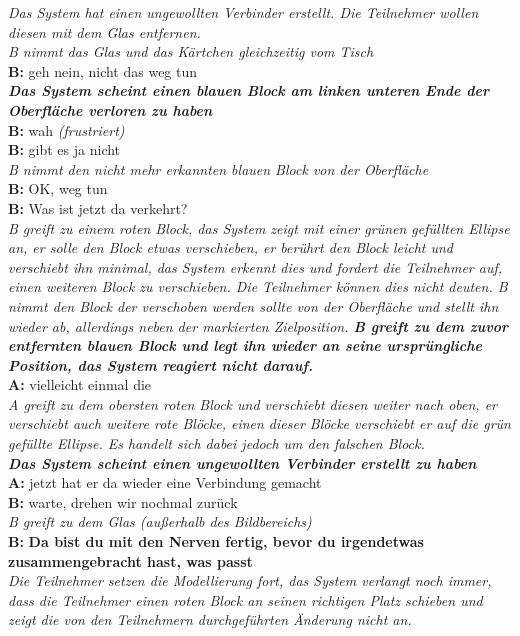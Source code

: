 \begin{transkript}
\emph{Das System hat einen ungewollten Verbinder erstellt. Die Teilnehmer wollen diesen mit dem Glas entfernen.} \\
\emph{B nimmt das Glas und das Kärtchen gleichzeitig vom Tisch} \\
\textbf{B:} geh nein, nicht das weg tun \\
\emph{\textbf{Das System scheint einen blauen Block am linken unteren Ende der Oberfläche verloren zu haben}} \\
\textbf{B:} wah \emph{(frustriert)} \\
\textbf{B:} gibt es ja nicht \\
\emph{B nimmt den nicht mehr erkannten blauen Block von der Oberfläche} \\
\textbf{B:} OK, weg tun \\
\textbf{B:} Was ist jetzt da verkehrt? \\
\emph{B greift zu einem roten Block, das System zeigt mit einer grünen gefüllten Ellipse an, er solle den Block etwas verschieben, er berührt den Block leicht und verschiebt ihn minimal, das System erkennt dies und fordert die Teilnehmer auf, einen weiteren Block zu verschieben. Die Teilnehmer können dies nicht deuten. B nimmt den Block der verschoben werden sollte von der Oberfläche und stellt ihn wieder ab, allerdings neben der markierten Zielposition. \textbf{B greift zu dem zuvor entfernten blauen Block und legt ihn wieder an seine ursprüngliche Position, das System reagiert nicht darauf.}} \\
\textbf{A:} vielleicht einmal die \\
\emph{A greift zu dem obersten roten Block und verschiebt diesen weiter nach oben, er verschiebt auch weitere rote Blöcke, einen dieser Blöcke verschiebt er auf die grün gefüllte Ellipse. Es handelt sich dabei jedoch um den falschen Block.} \\
\emph{\textbf{Das System scheint einen ungewollten Verbinder erstellt zu haben}} \\
\textbf{A:} jetzt hat er da wieder eine Verbindung gemacht \\
\textbf{B:} warte, drehen wir nochmal zurück \\
\emph{B greift zu dem Glas (außerhalb des Bildbereichs)} \\
\textbf{B:} \textbf{Da bist du mit den Nerven fertig, bevor du irgendetwas zusammengebracht hast, was passt} \\
\emph{Die Teilnehmer setzen die Modellierung fort, das System verlangt noch immer, dass die Teilnehmer einen roten Block an seinen richtigen Platz schieben und zeigt die von den Teilnehmern durchgeführten Änderung nicht an.} \\
\end{transkript}

